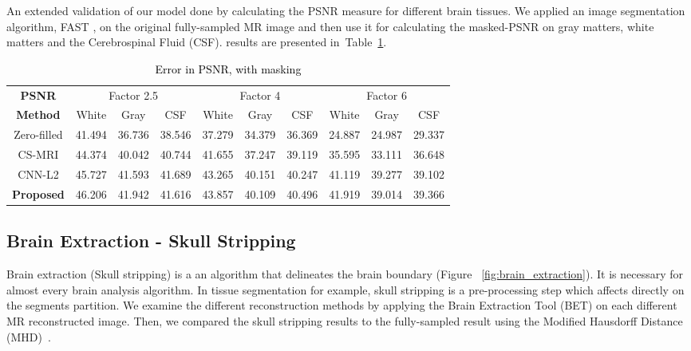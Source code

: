 \documentclass[review]{elsarticle}
\begin{document}
An extended validation of our model done by calculating the PSNR measure for different brain tissues. We applied an image segmentation algorithm, FAST \cite{zhang2001segmentation}, on the original fully-sampled MR image and then use it for calculating the masked-PSNR on gray matters, white matters and the Cerebrospinal Fluid (CSF). results are presented in~Table~\ref{tbl:PSNR_WITH_MASK}.


\begin{table}[H]
	\centering
\begin{tabular}{|c||c|c|c||c|c|c||c|c|c|}
	\hline 
	\textbf{PSNR} & \multicolumn{3}{c||}{Factor 2.5} & \multicolumn{3}{c||}{Factor 4} & \multicolumn{3}{c|}{Factor 6}\tabularnewline
	\cline{2-10} 
	 \textbf{Method}& White & Gray & CSF & White & Gray & CSF & White & Gray & CSF\tabularnewline
	 \hline 
	 Zero-filled & 41.494 & 36.736 & 38.546 & 37.279 & 34.379 & 36.369 & 24.887 & 24.987 & 29.337\tabularnewline
	 \hline 
	 CS-MRI & 44.374 & 40.042 & 40.744 & 41.655 & 37.247 & 39.119 & 35.595 & 33.111 & 36.648\tabularnewline
	 \hline 
	 CNN-L2 & 45.727 & 41.593 & 41.689 & 43.265 & 40.151 & 40.247 & 41.119 & 39.277 & 39.102\tabularnewline
	 \hline 
	 \textbf{Proposed} & 46.206 & 41.942 & 41.616 & 43.857 & 40.109 & 40.496 & 41.919 & 39.014 & 39.366\tabularnewline
	 \hline 
\end{tabular}
\caption{\textcolor{black}{\footnotesize{}{}Error in PSNR, with masking}{\footnotesize{}\label{tbl:PSNR_WITH_MASK}}}
\end{table}


\subsection{Brain Extraction - Skull Stripping}
Brain extraction (Skull stripping) is a an algorithm that delineates the brain boundary (Figure~ \ref{fig:brain_extraction}). It is necessary for almost every brain analysis algorithm. In tissue segmentation for example, skull stripping is a pre-processing step which affects directly on the segments partition. We examine the different reconstruction methods by applying the Brain Extraction Tool (BET) \cite{smith2002fast} on each different MR reconstructed image. Then, we compared the skull stripping results to the fully-sampled result using the Modified Hausdorff Distance (MHD)~\cite{dubuisson1994modified}.
\end{document}
